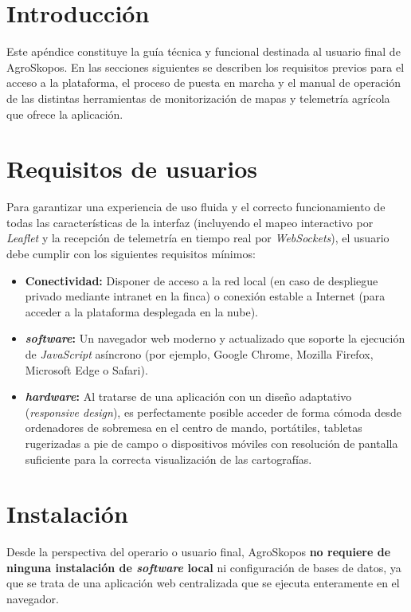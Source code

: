 
\section{Introducción}
Este apéndice constituye la guía técnica y funcional destinada al usuario final de AgroSkopos. En las secciones siguientes se describen los requisitos previos para el acceso a la plataforma, el proceso de puesta en marcha y el manual de operación de las distintas herramientas de monitorización de mapas y telemetría agrícola que ofrece la aplicación.

\section{Requisitos de usuarios}
Para garantizar una experiencia de uso fluida y el correcto funcionamiento de todas las características de la interfaz (incluyendo el mapeo interactivo por \textit{Leaflet} y la recepción de telemetría en tiempo real por \textit{WebSockets}), el usuario debe cumplir con los siguientes requisitos mínimos:

\begin{itemize}
    \item \textbf{Conectividad:} Disponer de acceso a la red local (en caso de despliegue privado mediante intranet en la finca) o conexión estable a Internet (para acceder a la plataforma desplegada en la nube).
    \item \textbf{\textit{software}:} Un navegador web moderno y actualizado que soporte la ejecución de \textit{JavaScript} asíncrono (por ejemplo, Google Chrome, Mozilla Firefox, Microsoft Edge o Safari).
    \item \textbf{\textit{hardware}:} Al tratarse de una aplicación con un diseño adaptativo (\textit{responsive design}), es perfectamente posible acceder de forma cómoda desde ordenadores de sobremesa en el centro de mando, portátiles, tabletas rugerizadas a pie de campo o dispositivos móviles con resolución de pantalla suficiente para la correcta visualización de las cartografías.
\end{itemize}

\section{Instalación}
Desde la perspectiva del operario o usuario final, AgroSkopos \textbf{no requiere de ninguna instalación de \textit{software} local} ni configuración de bases de datos, ya que se trata de una aplicación web centralizada que se ejecuta enteramente en el navegador.

